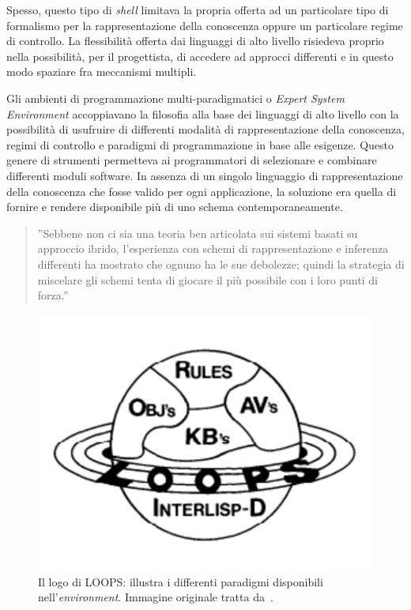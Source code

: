 Spesso, questo tipo di \emph{shell} limitava la propria offerta ad un particolare tipo di formalismo per la rappresentazione della conoscenza oppure un particolare regime di controllo. La flessibilità offerta dai linguaggi di alto livello risiedeva proprio nella possibilità, per il progettista, di accedere ad approcci differenti e in questo modo spaziare fra meccanismi multipli.

Gli ambienti di programmazione multi-paradigmatici o \emph{Expert System Environment} accoppiavano la filosofia alla base dei linguaggi di alto livello con la possibilità di usufruire di differenti modalità di rappresentazione della conoscenza, regimi di controllo e paradigmi di programmazione in base alle esigenze.
Questo genere di strumenti permetteva ai programmatori di selezionare e combinare differenti moduli software. In assenza di un singolo linguaggio di rappresentazione della conoscenza che fosse valido per ogni applicazione, la soluzione era quella di fornire e rendere disponibile più di uno schema contemporaneamente.

\begin{quote}
''Sebbene non ci sia una teoria ben articolata sui sistemi basati su approccio ibrido, l'esperienza con schemi di rappresentazione e inferenza differenti ha mostrato che ognuno ha le sue debolezze; quindi la strategia di miscelare gli schemi tenta di giocare il più possibile con i loro punti di forza.''~\cite{jackson1999}
\end{quote}

\begin{figure}[h]
\centering
\includegraphics[scale=0.7, viewport=0 0 272 184]{Immagini/Capitolo1/LOOPS-logo.pdf}
\caption[Il logo di LOOPS]{Il logo di LOOPS: illustra i differenti paradigmi disponibili nell'\emph{environment}. Immagine originale tratta da~\cite{loops1983aaai}.}\label{fig:logo-LOOPS}
\end{figure}


